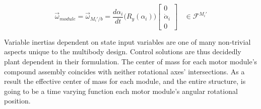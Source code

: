 \begin{equation}
\vec{\omega}_{module}=\vec{\omega}_{M_i'/b}=\frac{d\alpha_i}{dt}\big(R_y(\alpha_i)\big)\begin{bmatrix}
0\\
\dot{\alpha}_i\\
0
\end{bmatrix}~~~~\in\mathcal{F}^{M_i'}
\end{equation}
\par
Variable inertias dependent on state input variables are one of many non-trivial aspects unique to the multibody design. Control solutions are thus decidedly plant dependent in their formulation. The center of mass for each motor module's compound assembly coincides with neither rotational axes' intersections. As a result the effective center of mass for each module, and the entire structure, is going to be a time varying function each motor module's angular rotational position.
